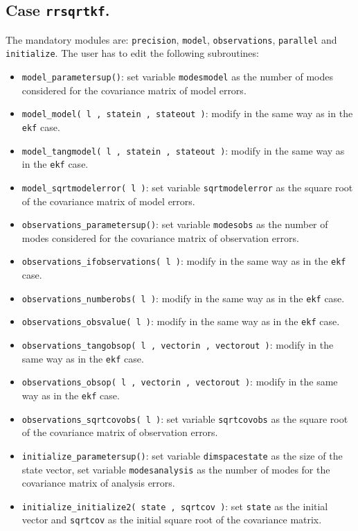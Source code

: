 \documentclass[12pt]{article}
\begin{document}
\subsection{Case {\tt rrsqrtkf}.}
The mandatory modules are: {\tt precision}, {\tt model}, {\tt observations}, {\tt parallel} and {\tt initialize}. The user has to edit the following subroutines:
\begin{itemize}
\item {\tt model\_parametersup()}: set variable {\tt modesmodel} as the number of modes considered for the covariance matrix of model errors.
\item {\tt model\_model( l , statein , stateout )}: modify in the same way as in the {\tt ekf} case.
\item {\tt model\_tangmodel( l , statein , stateout )}: modify in the same way as in the {\tt ekf} case.
\item {\tt model\_sqrtmodelerror( l )}: set variable {\tt sqrtmodelerror} as the square root of the covariance matrix of model errors.
\item {\tt observations\_parametersup()}: set variable {\tt modesobs} as the number of modes considered for the covariance matrix of observation errors.
\item {\tt observations\_ifobservations( l )}: modify in the same way as in the {\tt ekf} case.
\item {\tt observations\_numberobs( l )}: modify in the same way as in the {\tt ekf} case.
\item {\tt observations\_obsvalue( l )}: modify in the same way as in the {\tt ekf} case.
\item {\tt observations\_tangobsop( l , vectorin , vectorout )}: modify in the same way as in the {\tt ekf} case.
\item {\tt observations\_obsop( l , vectorin , vectorout )}: modify in the same way as in the {\tt ekf} case.
\item {\tt observations\_sqrtcovobs( l )}: set variable {\tt sqrtcovobs} as the square root of the covariance matrix of observation errors.
\item {\tt initialize\_parametersup()}: set variable {\tt dimspacestate} as the size of the state vector, set variable {\tt modesanalysis} as the number of modes for the covariance matrix of analysis errors.
\item {\tt initialize\_initialize2( state , sqrtcov )}: set {\tt state} as the initial vector and {\tt sqrtcov} as the initial square root of the covariance matrix.
\end{itemize}
\end{document}

